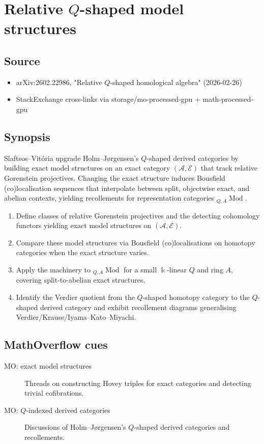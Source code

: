 \section*{Relative $Q$-shaped model structures}
\subsection*{Source}
\begin{itemize}
  \item arXiv:2602.22986, "Relative $Q$-shaped homological algebra" (2026-02-26)
  \item StackExchange cross-links via storage/mo-processed-gpu + math-processed-gpu
\end{itemize}
\subsection*{Synopsis}
Slaftsos--Vit\'oria upgrade Holm--J\o rgensen's $Q$-shaped derived categories by building exact model structures on an exact category $(\mathcal{A},\mathscr{E})$ that track relative Gorenstein projectives. Changing the exact structure induces Bousfield (co)localisation sequences that interpolate between split, objectwise exact, and abelian contexts, yielding recollements for representation categories ${}_{Q,A}\operatorname{Mod}$.
\begin{enumerate}
  \item Define classes of relative Gorenstein projectives and the detecting cohomology functors yielding exact model structures on $(\mathcal{A},\mathscr{E})$.
  \item Compare these model structures via Bousfield (co)localisations on homotopy categories when the exact structure varies.
  \item Apply the machinery to ${}_{Q,A}\operatorname{Mod}$ for a small $\Bbbk$-linear $Q$ and ring $A$, covering split-to-abelian exact structures.
  \item Identify the Verdier quotient from the $Q$-shaped homotopy category to the $Q$-shaped derived category and exhibit recollement diagrams generalising Verdier/Krause/Iyama--Kato--Miyachi.
\end{enumerate}
\subsection*{MathOverflow cues}
\begin{description}
  \item[MO: exact model structures] Threads on constructing Hovey triples for exact categories and detecting trivial cofibrations.
  \item[MO: $Q$-indexed derived categories] Discussions of Holm--J\o rgensen's $Q$-shaped derived categories and recollements.
\end{description}
